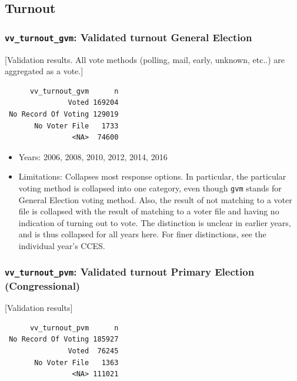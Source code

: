\documentclass[10pt,article,oneside]{memoir}
\theoremstyle{definition}
\begin{document}
\subsection{Turnout}\label{turnout}

\subsubsection{\texorpdfstring{\texttt{vv\_turnout\_gvm}: Validated
turnout General
Election}{vv\_turnout\_gvm: Validated turnout General Election}}\label{vv_turnout_gvm-validated-turnout-general-election}

{[}Validation results. All vote methods (polling, mail, early, unknown,
etc..) are aggregated as a vote.{]}

\begin{verbatim}
      vv_turnout_gvm      n
               Voted 169204
 No Record Of Voting 129019
       No Voter File   1733
                <NA>  74600
\end{verbatim}

\begin{itemize}
\tightlist
\item
  Years: 2006, 2008, 2010, 2012, 2014, 2016
\item
  Limitations: Collapses most response options. In particular, the
  particular voting method is collapsed into one category, even though
  \texttt{gvm} stands for General Election voting method. Also, the
  result of not matching to a voter file is collapsed with the result of
  matching to a voter file and having no indication of turning out to
  vote. The distinction is unclear in earlier years, and is thus
  collapsed for all years here. For finer distinctions, see the
  individual year's CCES.
\end{itemize}

\subsubsection{\texorpdfstring{\texttt{vv\_turnout\_pvm}: Validated
turnout Primary Election
(Congressional)}{vv\_turnout\_pvm: Validated turnout Primary Election (Congressional)}}\label{vv_turnout_pvm-validated-turnout-primary-election-congressional}

{[}Validation results{]}

\begin{verbatim}
      vv_turnout_pvm      n
 No Record Of Voting 185927
               Voted  76245
       No Voter File   1363
                <NA> 111021
\end{verbatim}
\end{document}
